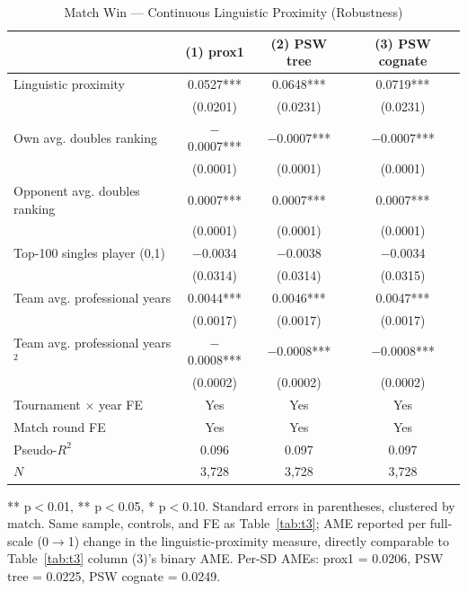 \documentclass[10pt]{article}
\begin{document}
\begin{table}[htbp]
\color{blue}
\centering
\caption{Match Win — Continuous Linguistic Proximity (Robustness) \label{tab:t3d}}
\begin{threeparttable}
\begin{tabular}{lccc}
\toprule
 & (1) prox1 & (2) PSW tree & (3) PSW cognate \\
\midrule
Linguistic proximity & 0.0527*** & 0.0648*** & 0.0719*** \\
 & (0.0201) & (0.0231) & (0.0231) \\
Own avg. doubles ranking & $-$0.0007*** & $-$0.0007*** & $-$0.0007*** \\
 & (0.0001) & (0.0001) & (0.0001) \\
Opponent avg. doubles ranking & 0.0007*** & 0.0007*** & 0.0007*** \\
 & (0.0001) & (0.0001) & (0.0001) \\
Top-100 singles player (0,1)& $-$0.0034 & $-$0.0038 & $-$0.0034 \\
 & (0.0314) & (0.0314) & (0.0315) \\
Team avg. professional years  & 0.0044*** & 0.0046*** & 0.0047*** \\
 & (0.0017) & (0.0017) & (0.0017) \\
Team avg. professional years$^2$  & $-$0.0008*** & $-$0.0008*** & $-$0.0008*** \\
 & (0.0002) & (0.0002) & (0.0002) \\
\midrule
Tournament $\times$ year FE & Yes & Yes & Yes \\
Match round FE & Yes & Yes & Yes \\
Pseudo-$R^2$ & 0.096 & 0.097 & 0.097 \\
$N$ & 3,728 & 3,728 & 3,728 \\
\bottomrule
\end{tabular}
\begin{tablenotes}
\small
\item *** p$<$0.01, ** p$<$0.05, * p$<$0.10. Standard errors in parentheses, clustered by match. Same sample, controls, and FE as Table~\ref{tab:t3}; AME reported per full-scale (0$\to$1) change in the linguistic-proximity measure, directly comparable to Table~\ref{tab:t3} column (3)'s binary AME. Per-SD AMEs: prox1 = 0.0206, PSW tree = 0.0225, PSW cognate = 0.0249.
\end{tablenotes}
\end{threeparttable}
\end{table}
\FloatBarrier
\end{document}
